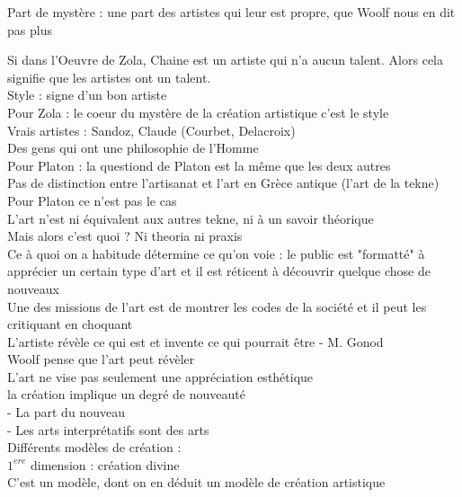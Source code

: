 \documentclass[a4paper,twocolumn,landscape]{article}
\begin{document}
Part de mystère : une part des artistes qui leur est propre, que Woolf nous en dit pas plus 

Si dans l'Oeuvre de Zola, Chaine est un artiste qui n'a aucun talent. 
Alors cela signifie que les artistes ont un talent. \\
Style : signe d'un bon artiste \\

Pour Zola : le coeur du mystère de la création artistique c'est le style\\
Vrais artistes : Sandoz, Claude (Courbet, Delacroix)\\
Des gens qui ont une philosophie de l'Homme\\

Pour Platon : la questiond de Platon est la même que les deux autres\\
Pas de distinction entre l'artisanat et l'art en Grèce antique (l'art de la tekne) \\
Pour Platon ce n'est pas le cas\\
L'art n'est ni équivalent aux autres tekne, ni à un savoir théorique \\
Mais alors c'est quoi ? Ni theoria ni praxis\\ 

Ce à quoi on a habitude détermine ce qu'on voie : le public est 
"formatté" à apprécier un certain type d'art et il est réticent à 
découvrir quelque chose de nouveaux\\

Une des missions de l'art est de montrer les codes de la société
et il peut les critiquant en choquant\\

\noindent L'artiste révèle ce qui est et invente ce qui pourrait être - M. Gonod \\
Woolf pense que l'art peut révèler \\
L'art ne vise pas seulement une appréciation esthétique \\

\noindent
la création implique un degré de nouveauté\\
- La part du nouveau \\
- Les arts interprétatifs sont des arts \\ 

Différents modèles de création : \\
\noindent
\(1^{ere}\) dimension : création divine \\
C'est un modèle, dont on en déduit un modèle de création artistique\\
\end{document}
